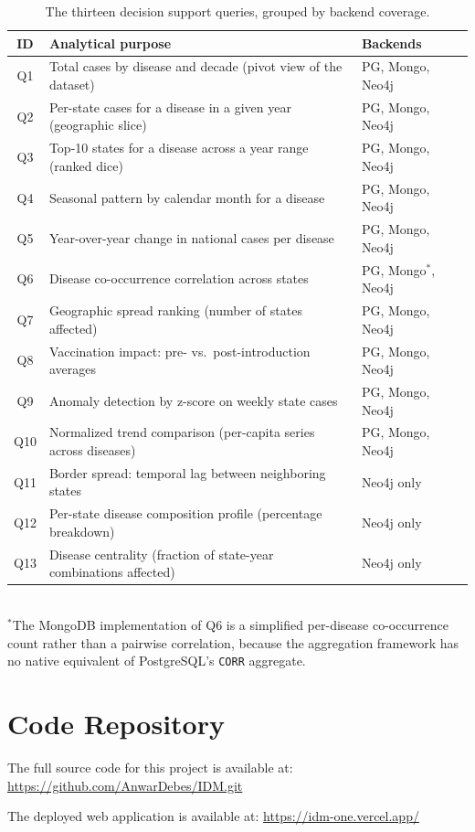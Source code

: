 \documentclass[12pt,a4paper]{article}
\begin{document}
\begin{table}[H]
\centering
\small
\caption{The thirteen decision support queries, grouped by backend coverage.}
\label{tab:querylist}
\begin{tabular}{cp{8.2cm}l}
\toprule
\textbf{ID} & \textbf{Analytical purpose} & \textbf{Backends} \\
\midrule
Q1  & Total cases by disease and decade (pivot view of the dataset)              & PG, Mongo, Neo4j \\
Q2  & Per-state cases for a disease in a given year (geographic slice)           & PG, Mongo, Neo4j \\
Q3  & Top-10 states for a disease across a year range (ranked dice)              & PG, Mongo, Neo4j \\
Q4  & Seasonal pattern by calendar month for a disease                           & PG, Mongo, Neo4j \\
Q5  & Year-over-year change in national cases per disease                        & PG, Mongo, Neo4j \\
Q6  & Disease co-occurrence correlation across states                            & PG, Mongo$^{\ast}$, Neo4j \\
Q7  & Geographic spread ranking (number of states affected)                      & PG, Mongo, Neo4j \\
Q8  & Vaccination impact: pre- vs.\ post-introduction averages                   & PG, Mongo, Neo4j \\
Q9  & Anomaly detection by z-score on weekly state cases                         & PG, Mongo, Neo4j \\
Q10 & Normalized trend comparison (per-capita series across diseases)            & PG, Mongo, Neo4j \\
Q11 & Border spread: temporal lag between neighboring states                     & Neo4j only \\
Q12 & Per-state disease composition profile (percentage breakdown)               & Neo4j only \\
Q13 & Disease centrality (fraction of state-year combinations affected)          & Neo4j only \\
\bottomrule
\end{tabular}
\\[4pt]
{\footnotesize $^{\ast}$The MongoDB implementation of Q6 is a simplified per-disease co-occurrence count rather than a pairwise correlation, because the aggregation framework has no native equivalent of PostgreSQL's \texttt{CORR} aggregate.}
\end{table}

\section{Code Repository}
\label{app:repo}

The full source code for this project is available at:
\url{https://github.com/AnwarDebes/IDM.git}

The deployed web application is available at:
\url{https://idm-one.vercel.app/}
\end{document}
